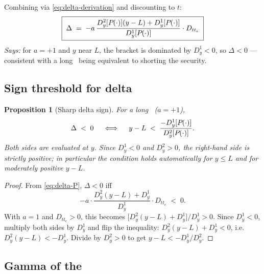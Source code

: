 \documentclass[11pt,a4paper]{article}
\newcommand{\Tlock}{\text{T-Lock}}
\newcommand{\dD}[1]{D_{y}^{#1}}
\newtheorem{proposition}{Proposition}
\begin{document}
Combining via \eqref{eq:delta-derivation} and discounting to $t$:
\begin{equation}\label{eq:delta-P}
\boxed{\;
\Delta \;=\; -a\, \frac{\dD{2}[\Bond{}{\cdot}](y - L) + \dD{1}[\Bond{}{\cdot}]}{\dD{1}[\Bond{}{\cdot}]} \cdot D_{tt_e}\;
}
\end{equation}
\textit{Says:} for $a=+1$ and $y$ near $L$, the bracket is dominated
by $\dD{1} < 0$, so $\Delta < 0$ --- consistent with a long
\Tlock\ being equivalent to shorting the security.

\subsection{Sign threshold for delta}

\begin{proposition}[Sharp delta sign]\label{prop:delta-sign}
For a long \Tlock\ ($a = +1$),
\begin{equation}\label{eq:delta-cond}
\Delta \;<\; 0
\quad \iff \quad
y - L \;<\; \frac{-\dD{1}[\Bond{}{\cdot}]}{\dD{2}[\Bond{}{\cdot}]}.
\end{equation}
Both sides are evaluated at $y$. Since $\dD{1} < 0$ and $\dD{2} > 0$,
the right-hand side is strictly positive; in particular the condition
holds automatically for $y \le L$ and for moderately positive $y - L$.
\end{proposition}

\begin{proof}
From \eqref{eq:delta-P}, $\Delta < 0$ iff
\[
  -a \cdot \frac{\dD{2}(y - L) + \dD{1}}{\dD{1}} \cdot D_{tt_e} \;<\; 0.
\]
With $a = 1$ and $D_{tt_e} > 0$, this becomes
$\bigl[\dD{2}(y - L) + \dD{1}\bigr] / \dD{1} > 0$. Since $\dD{1} < 0$,
multiply both sides by $\dD{1}$ and flip the inequality:
$\dD{2}(y - L) + \dD{1} < 0$, i.e.\ $\dD{2}(y - L) < -\dD{1}$. Divide
by $\dD{2} > 0$ to get $y - L < -\dD{1}/\dD{2}$.
\end{proof}

\subsection{Gamma of the \Tlock}
\end{document}
